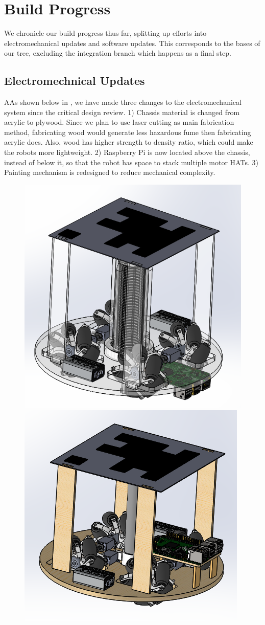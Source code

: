 
\section{Build Progress}
\label{sec:build_progress}

We chronicle our build progress thus far, splitting up efforts into electromechanical updates and software updates. This corresponds to the bases of our tree, excluding the integration branch which happens as a final step. 

\subsection{Electromechnical Updates}
\label{sec:electromechanical_progress}

AAs shown below in , we have made three changes to the electromechanical system since the critical design review. 1) Chassis material is changed from acrylic to plywood. Since we plan to use laser cutting as main fabrication method, fabricating wood would generate less hazardous fume then fabricating acrylic does. Also, wood has higher strength to density ratio, which could make the robots more lightweight. 2) Raspberry Pi is now located above the chassis, instead of below it, so that the robot has space to stack multiple motor HATs. 3) Painting mechanism is redesigned to reduce mechanical complexity.

\begin{figure}[h!]
\centering
\includegraphics[width=0.49\columnwidth]{CAD/full_old.PNG}
\includegraphics[width=0.49\columnwidth]{CAD/full_new.PNG}
\label{fig:em1}
\end{figure}

